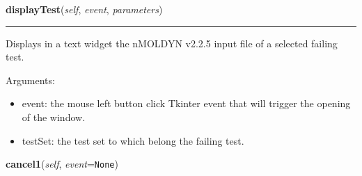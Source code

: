 \hspace{.8\funcindent}\begin{boxedminipage}{\funcwidth}

    \raggedright \textbf{displayTest}(\textit{self}, \textit{event}, \textit{parameters})

    \vspace{-1.5ex}

    \rule{\textwidth}{0.5\fboxrule}
\setlength{\parskip}{2ex}
    Displays in a text widget the nMOLDYN v2.2.5 input file of a selected 
    failing test.

    Arguments:

    \begin{itemize}
    \setlength{\parskip}{0.6ex}
      \item event: the mouse left button click Tkinter event that will trigger 
        the opening of the window.

      \item testSet: the test set to which belong the failing test.

    \end{itemize}

\setlength{\parskip}{1ex}
    \end{boxedminipage}

    \label{nMOLDYN:GUI:AnalysisBenchmarkDialog:AnalysisBenchmarkDialog:cancel1}

    \vspace{0.5ex}

\hspace{.8\funcindent}\begin{boxedminipage}{\funcwidth}

    \raggedright \textbf{cancel1}(\textit{self}, \textit{event}={\tt None})

\setlength{\parskip}{2ex}
\setlength{\parskip}{1ex}
    \end{boxedminipage}

    \label{nMOLDYN:GUI:AnalysisBenchmarkDialog:AnalysisBenchmarkDialog:clearResults}

